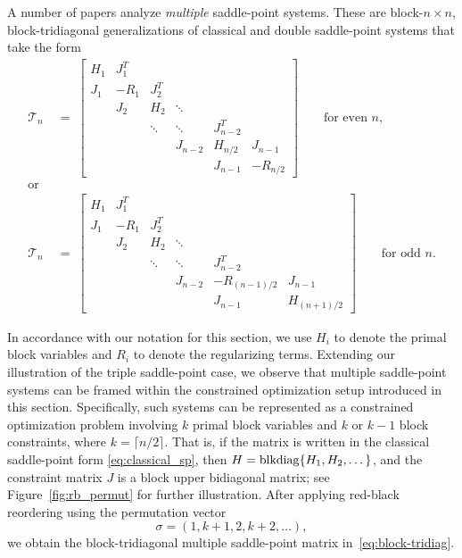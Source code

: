 \documentclass{article}
\newcommand{\sT}{\mathcal{T}}
\begin{document}
A number of papers \cite{bb26,bmpp25,pp21,sz18}  analyze \textit{multiple} saddle-point systems. These are block-$n \times n$, block-tridiagonal generalizations of classical and double saddle-point systems that take the form
\begin{subequations}
\label{eq:block-tridiag}
\begin{align}
\sT_n &\;=\;
\begin{bmatrix}
H_{1}      & J_{1}^T   &             &             &            &\\
J_{1}      & -R_{1}   & J_{2}^T      &             &            &\\
           & J_{2}    & H_{2}       & \ddots      &            &\\
           &          & \ddots      & \ddots      & J_{n-2}^T  & \\
           &          &             & J_{n-2}     & H_{n/2} & J_{n-1} \\
           &          &              &            & J_{n-1} & -R_{n/2}
\end{bmatrix} \qquad \textrm{for even $n$}, \\
\textrm {or} \nonumber \\
\sT_n &\;=\;
\begin{bmatrix}
H_{1}      & J_{1}^T   &             &             &            &\\
J_{1}      & -R_{1}   & J_{2}^T      &             &            &\\
           & J_{2}    & H_{2}       & \ddots      &            &\\
           &          & \ddots      & \ddots      & J_{n-2}^T  & \\
           &          &             & J_{n-2}     & -R_{(n-1)/2} & J_{n-1} \\
           &          &              &            & J_{n-1} & H_{(n+1)/2}
\end{bmatrix} \qquad \textrm{for odd $n$.}
\end{align}
\end{subequations}

In accordance  with our notation for this section, we use \( H_i \) to denote the  primal block variables and \( R_i \) to denote the regularizing terms. Extending our illustration of the triple saddle-point case, we observe that multiple saddle-point systems can  be framed within the constrained optimization setup introduced in this section. Specifically, such systems can be represented as a constrained optimization problem involving \( k \) primal block variables and \( k \) or \( k-1 \) block constraints, where $k = \lceil n/2  \rceil$. That is, if the matrix is written in the classical saddle-point form \eqref{eq:classical_sp}, then $H={\rm blkdiag} \{H_1, H_2,\dots \}$, and the constraint matrix $J$ is a block upper bidiagonal matrix; see Figure~\ref{fig:rb_permut} for further illustration. After applying red-black reordering \cite[p. 159]{young1971iterative} using the permutation vector
\[
\sigma = (1, k+1, 2, k+2, \ldots),
\]
we obtain the block-tridiagonal multiple saddle-point matrix  in~\eqref{eq:block-tridiag}.
\end{document}
